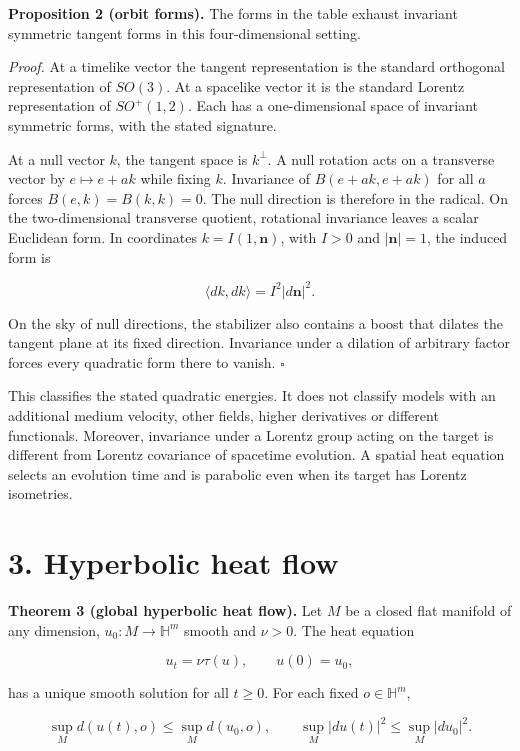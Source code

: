 \documentclass[
  11pt,
  a4paper,
]{article}
\begin{document}
\textbf{Proposition 2 (orbit forms).} The forms in the table exhaust invariant symmetric tangent forms in this four-dimensional setting.

\emph{Proof.} At a timelike vector the tangent representation is the standard orthogonal representation of \(SO(3)\). At a spacelike vector it is the standard Lorentz representation of \(SO^+(1,2)\). Each has a one-dimensional space of invariant symmetric forms, with the stated signature.

At a null vector \(k\), the tangent space is \(k^\perp\). A null rotation acts on a transverse vector by \(e\mapsto e+ak\) while fixing \(k\). Invariance of \(B(e+ak,e+ak)\) for all \(a\) forces \(B(e,k)=B(k,k)=0\). The null direction is therefore in the radical. On the two-dimensional transverse quotient, rotational invariance leaves a scalar Euclidean form. In coordinates \(k=I(1,\mathbf n)\), with \(I>0\) and \(|\mathbf n|=1\), the induced form is

\[
\langle dk,dk\rangle=I^2|d\mathbf n|^2.
\]

On the sky of null directions, the stabilizer also contains a boost that dilates the tangent plane at its fixed direction. Invariance under a dilation of arbitrary factor forces every quadratic form there to vanish. \(\square\)

This classifies the stated quadratic energies. It does not classify models with an additional medium velocity, other fields, higher derivatives or different functionals. Moreover, invariance under a Lorentz group acting on the target is different from Lorentz covariance of spacetime evolution. A spatial heat equation selects an evolution time and is parabolic even when its target has Lorentz isometries.

\section{3. Hyperbolic heat flow}\label{hyperbolic-heat-flow}

\textbf{Theorem 3 (global hyperbolic heat flow).} Let \(M\) be a closed flat manifold of any dimension, \(u_0:M\to\mathbb H^m\) smooth and \(\nu>0\). The heat equation

\[
u_t=\nu\tau(u),\qquad u(0)=u_0,
\]

has a unique smooth solution for all \(t\geq0\). For each fixed \(o\in\mathbb H^m\),

\[
\sup_Md(u(t),o)\leq\sup_Md(u_0,o),\qquad
\sup_M|du(t)|^2\leq\sup_M|du_0|^2.
\]
\end{document}
